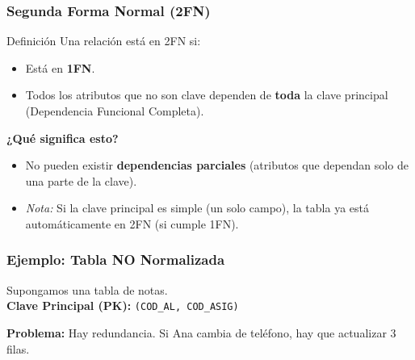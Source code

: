 \documentclass{beamer}
\begin{document}
\begin{frame}
  \frametitle{Segunda Forma Normal (2FN)}

  \begin{alertblock}{Definición}
    Una relación está en 2FN si:
    \begin{itemize}
        \item Está en \textbf{1FN}.
        \item Todos los atributos que no son clave dependen de \textbf{toda} la clave principal (Dependencia Funcional Completa).
    \end{itemize}
  \end{alertblock}

  \vspace{1em}
  \textbf{¿Qué significa esto?}
  \begin{itemize}
      \item No pueden existir \textbf{dependencias parciales} (atributos que dependan solo de una parte de la clave).
      \item \textit{Nota:} Si la clave principal es simple (un solo campo), la tabla ya está automáticamente en 2FN (si cumple 1FN).
  \end{itemize}
\end{frame}

\begin{frame}
  \frametitle{Ejemplo: Tabla NO Normalizada}

  Supongamos una tabla de notas.
  \\ \textbf{Clave Principal (PK):} \texttt{(COD\_AL, COD\_ASIG)}

  \begin{center}
  \end{center}
  
  \vspace{0.5em}
  \small{\textbf{Problema:} Hay redundancia. Si Ana cambia de teléfono, hay que actualizar 3 filas.}
\end{frame}
\end{document}
